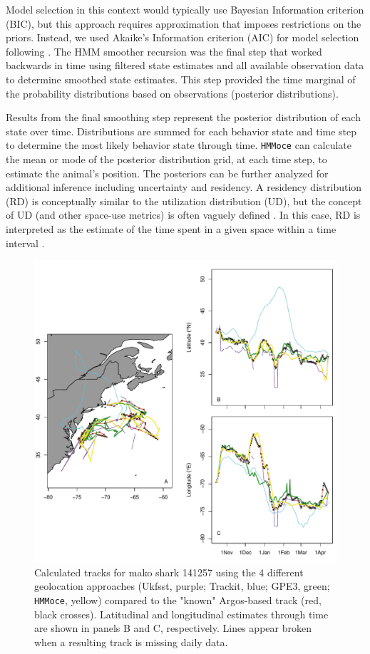 Model selection in this context would typically use Bayesian Information
criterion (BIC), but this approach requires approximation that imposes
restrictions on the priors. Instead, we used Akaike's Information
criterion (AIC) for model selection following \citet{Pedersen2011}. The
HMM smoother recursion was the final step that worked backwards in time
using filtered state estimates and all available observation data to
determine smoothed state estimates. This step provided the time marginal
of the probability distributions based on observations (posterior
distributions).

Results from the final smoothing step represent the posterior
distribution of each state over time. Distributions are summed for each
behavior state and time step to determine the most likely behavior state
through time. \texttt{HMMoce} can calculate the mean or mode of the
posterior distribution grid, at each time step, to estimate the animal's
position. The posteriors can be further analyzed for additional
inference including uncertainty and residency. A residency distribution
(RD) is conceptually similar to the utilization distribution (UD), but
the concept of UD (and other space-use metrics) is often vaguely defined
\citep{Royle2008}. In this case, RD is interpreted as the estimate of
the time spent in a given space within a time interval \citep[see Eq. 5
in][]{Pedersen2011}.

\begin{figure}[p!]
\centering
\includegraphics[width=1\textwidth]{images/C2_Fig2.pdf}
\caption[Comparison of results from various geolocation approaches]{Calculated tracks for mako shark 141257 using the 4 different
geolocation approaches (Ukfsst, purple; Trackit, blue; GPE3, green;
\texttt{HMMoce}, yellow) compared to the "known" Argos-based track
(red, black crosses). Latitudinal and longitudinal estimates through
time are shown in panels B and C, respectively. Lines appear broken when
a resulting track is missing daily data.}
\label{fig:c2f2}
\end{figure}

